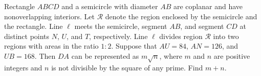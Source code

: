 Rectangle $ ABCD$ and a semicircle with diameter $ AB$ are coplanar and have nonoverlapping interiors. Let $ \mathcal{R}$ denote the region enclosed by the semicircle and the rectangle. Line $ \ell$ meets the semicircle, segment $ AB$, and segment $ CD$ at distinct points $ N$, $ U$, and $ T$, respectively. Line $ \ell$ divides region $ \mathcal{R}$ into two regions with areas in the ratio $ 1: 2$. Suppose that $ AU = 84$, $ AN = 126$, and $ UB = 168$. Then $ DA$ can be represented as $ m\sqrt {n}$, where $ m$ and $ n$ are positive integers and $ n$ is not divisible by the square of any prime. Find $ m + n$.
